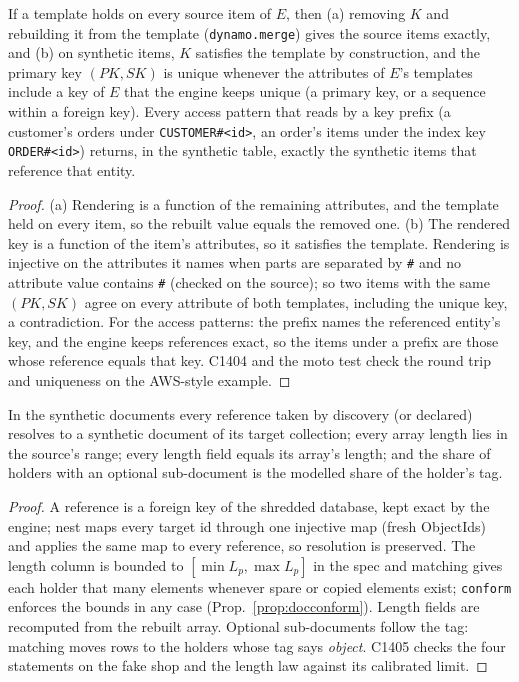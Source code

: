 \begin{proposition}\label{prop:dockeys}
If a template holds on every source item of $E$, then (a) removing $K$ and rebuilding it from the template
(\texttt{dynamo.merge}) gives the source items exactly, and (b) on synthetic items, $K$ satisfies the template by
construction, and the primary key $(PK, SK)$ is unique whenever the attributes of $E$'s templates include a key of
$E$ that the engine keeps unique (a primary key, or a sequence within a foreign key). Every access pattern that
reads by a key prefix (a customer's orders under \texttt{CUSTOMER\#<id>}, an order's items under the index key
\texttt{ORDER\#<id>}) returns, in the synthetic table, exactly the synthetic items that reference that entity.
\end{proposition}
\begin{proof}
(a) Rendering is a function of the remaining attributes, and the template held on every item, so the rebuilt value
equals the removed one. (b) The rendered key is a function of the item's attributes, so it satisfies the template.
Rendering is injective on the attributes it names when parts are separated by \texttt{\#} and no attribute value
contains \texttt{\#} (checked on the source); so two items with the same $(PK,SK)$ agree on every attribute of
both templates, including the unique key, a contradiction. For the access patterns: the prefix names the referenced
entity's key, and the engine keeps references exact, so the items under a prefix are those whose reference equals
that key. C1404 and the moto test check the round trip and uniqueness on the AWS-style example.
\end{proof}

\begin{proposition}\label{prop:docrefs}
In the synthetic documents every reference taken by discovery (or declared) resolves to a synthetic document of its
target collection; every array length lies in the source's range; every length field equals its array's length;
and the share of holders with an optional sub-document is the modelled share of the holder's tag.
\end{proposition}
\begin{proof}
A reference is a foreign key of the shredded database, kept exact by the engine; nest maps every target id through
one injective map (fresh ObjectIds) and applies the same map to every reference, so resolution is preserved. The
length column is bounded to $[\min L_p,\max L_p]$ in the spec and matching gives each holder that many elements
whenever spare or copied elements exist; \texttt{conform} enforces the bounds in any case
(Prop.~\ref{prop:docconform}). Length fields are recomputed from the rebuilt array. Optional sub-documents follow
the tag: matching moves rows to the holders whose tag says \emph{object}. C1405 checks the four statements on the
fake shop and the length law against its calibrated limit.
\end{proof}


